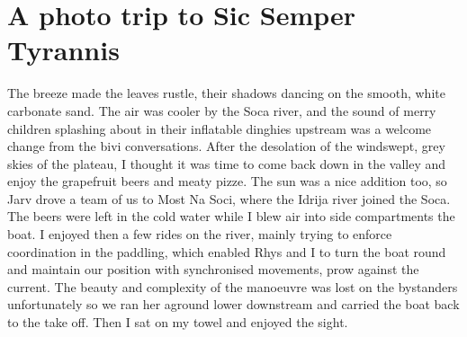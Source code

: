 \section{A photo trip to Sic Semper Tyrannis}
    \begin{marginfigure}
    \end{marginfigure}

    The breeze made the leaves rustle, their shadows dancing on the smooth, white carbonate sand. The air was cooler by the Soca river, and the sound of merry children splashing about in their inflatable dinghies upstream was a welcome change from the bivi conversations. 
    After the desolation of the windswept, grey skies of the plateau, I thought it was time to come back down in the valley and enjoy the grapefruit beers and meaty pizze. The sun was a nice addition too, so Jarv drove a team of us to Most Na Soci, where the Idrija river joined the Soca. The beers were left in the cold water while I blew air into side compartments the boat. 
    I enjoyed then a few rides on the river, mainly trying to enforce coordination in the paddling, which enabled Rhys and I to turn the boat round and maintain our position with synchronised movements, prow against the current. The beauty and complexity of the manoeuvre was lost on the bystanders unfortunately so we ran her aground lower downstream and carried the boat back to the take off. Then I sat on my towel and enjoyed the sight.

